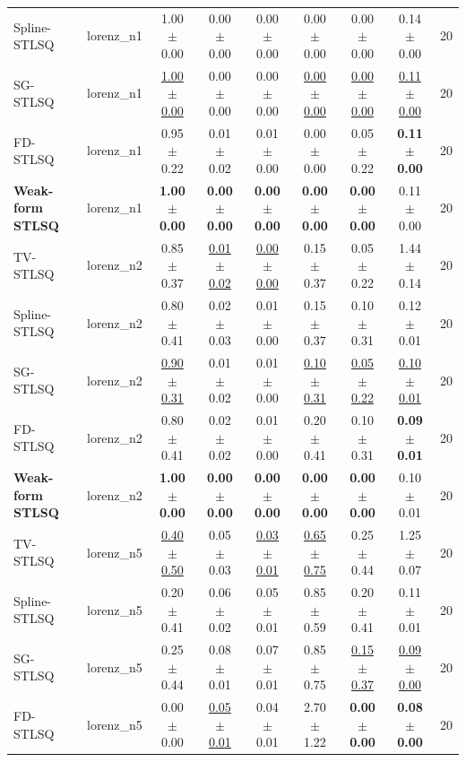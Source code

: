 \begin{tabular}{llccccccc}
Spline-STLSQ & lorenz\_n1 & 1.00 $\pm$ 0.00 & 0.00 $\pm$ 0.00 & 0.00 $\pm$ 0.00 & 0.00 $\pm$ 0.00 & 0.00 $\pm$ 0.00 & 0.14 $\pm$ 0.00 & 20 \\
SG-STLSQ & lorenz\_n1 & \underline{1.00 $\pm$ 0.00} & 0.00 $\pm$ 0.00 & 0.00 $\pm$ 0.00 & \underline{0.00 $\pm$ 0.00} & \underline{0.00 $\pm$ 0.00} & \underline{0.11 $\pm$ 0.00} & 20 \\
FD-STLSQ & lorenz\_n1 & 0.95 $\pm$ 0.22 & 0.01 $\pm$ 0.02 & 0.01 $\pm$ 0.00 & 0.00 $\pm$ 0.00 & 0.05 $\pm$ 0.22 & \textbf{0.11 $\pm$ 0.00} & 20 \\
\textbf{Weak-form STLSQ} & lorenz\_n1 & \textbf{1.00 $\pm$ 0.00} & \textbf{0.00 $\pm$ 0.00} & \textbf{0.00 $\pm$ 0.00} & \textbf{0.00 $\pm$ 0.00} & \textbf{0.00 $\pm$ 0.00} & 0.11 $\pm$ 0.00 & 20 \\
\midrule
TV-STLSQ & lorenz\_n2 & 0.85 $\pm$ 0.37 & \underline{0.01 $\pm$ 0.02} & \underline{0.00 $\pm$ 0.00} & 0.15 $\pm$ 0.37 & 0.05 $\pm$ 0.22 & 1.44 $\pm$ 0.14 & 20 \\
Spline-STLSQ & lorenz\_n2 & 0.80 $\pm$ 0.41 & 0.02 $\pm$ 0.03 & 0.01 $\pm$ 0.00 & 0.15 $\pm$ 0.37 & 0.10 $\pm$ 0.31 & 0.12 $\pm$ 0.01 & 20 \\
SG-STLSQ & lorenz\_n2 & \underline{0.90 $\pm$ 0.31} & 0.01 $\pm$ 0.02 & 0.01 $\pm$ 0.00 & \underline{0.10 $\pm$ 0.31} & \underline{0.05 $\pm$ 0.22} & \underline{0.10 $\pm$ 0.01} & 20 \\
FD-STLSQ & lorenz\_n2 & 0.80 $\pm$ 0.41 & 0.02 $\pm$ 0.02 & 0.01 $\pm$ 0.00 & 0.20 $\pm$ 0.41 & 0.10 $\pm$ 0.31 & \textbf{0.09 $\pm$ 0.01} & 20 \\
\textbf{Weak-form STLSQ} & lorenz\_n2 & \textbf{1.00 $\pm$ 0.00} & \textbf{0.00 $\pm$ 0.00} & \textbf{0.00 $\pm$ 0.00} & \textbf{0.00 $\pm$ 0.00} & \textbf{0.00 $\pm$ 0.00} & 0.10 $\pm$ 0.01 & 20 \\
\midrule
TV-STLSQ & lorenz\_n5 & \underline{0.40 $\pm$ 0.50} & 0.05 $\pm$ 0.03 & \underline{0.03 $\pm$ 0.01} & \underline{0.65 $\pm$ 0.75} & 0.25 $\pm$ 0.44 & 1.25 $\pm$ 0.07 & 20 \\
Spline-STLSQ & lorenz\_n5 & 0.20 $\pm$ 0.41 & 0.06 $\pm$ 0.02 & 0.05 $\pm$ 0.01 & 0.85 $\pm$ 0.59 & 0.20 $\pm$ 0.41 & 0.11 $\pm$ 0.01 & 20 \\
SG-STLSQ & lorenz\_n5 & 0.25 $\pm$ 0.44 & 0.08 $\pm$ 0.01 & 0.07 $\pm$ 0.01 & 0.85 $\pm$ 0.75 & \underline{0.15 $\pm$ 0.37} & \underline{0.09 $\pm$ 0.00} & 20 \\
FD-STLSQ & lorenz\_n5 & 0.00 $\pm$ 0.00 & \underline{0.05 $\pm$ 0.01} & 0.04 $\pm$ 0.01 & 2.70 $\pm$ 1.22 & \textbf{0.00 $\pm$ 0.00} & \textbf{0.08 $\pm$ 0.00} & 20 \\

\end{tabular}
